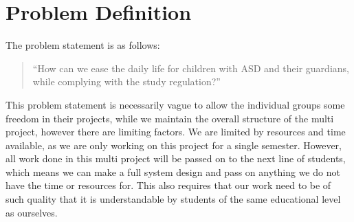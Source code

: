 \section{Problem Definition}
The problem statement is as follows:

\begin{quotation}
``How can we ease the daily life for children with ASD and their guardians, while complying with the study regulation?'' 
\end{quotation}

This problem statement is necessarily vague to allow the individual groups some freedom in their projects, while we maintain the overall structure of the multi project, however there are limiting factors.
We are limited by resources and time available, as we are only working on this project for a single semester. 
However, all work done in this multi project will be passed on to the next line of students, which means we can make a full system design and pass on anything we do not have the time or resources for.
This also requires that our work need to be of such quality that it is understandable by students of the same educational level as ourselves.
